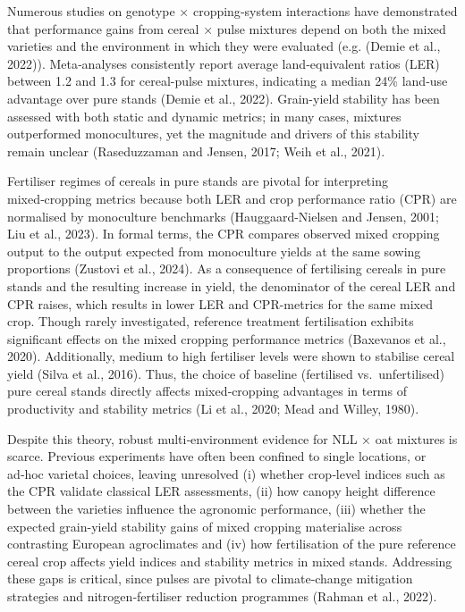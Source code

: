 \documentclass[
  british,
  a4paper,
  DIV=11,
  numbers=noendperiod]{scrreprt}
\begin{document}
Numerous studies on genotype × cropping‑system interactions have
demonstrated that performance gains from cereal × pulse mixtures depend
on both the mixed varieties and the environment in which they were
evaluated (e.g. (Demie et al., 2022)). Meta‑analyses consistently report
average land‑equivalent ratios (LER) between 1.2 and 1.3 for
cereal-pulse mixtures, indicating a median 24\% land‑use advantage over
pure stands (Demie et al., 2022). Grain-yield stability has been
assessed with both static and dynamic metrics; in many cases, mixtures
outperformed monocultures, yet the magnitude and drivers of this
stability remain unclear (Raseduzzaman and Jensen, 2017; Weih et al.,
2021).

Fertiliser regimes of cereals in pure stands are pivotal for
interpreting mixed‑cropping metrics because both LER and crop
performance ratio (CPR) are normalised by monoculture benchmarks
(Hauggaard-Nielsen and Jensen, 2001; Liu et al., 2023). In formal terms,
the CPR compares observed mixed cropping output to the output expected
from monoculture yields at the same sowing proportions (Zustovi et al.,
2024). As a consequence of fertilising cereals in pure stands and the
resulting increase in yield, the denominator of the cereal LER and CPR
raises, which results in lower LER and CPR-metrics for the same mixed
crop. Though rarely investigated, reference treatment fertilisation
exhibits significant effects on the mixed cropping performance metrics
(Baxevanos et al., 2020). Additionally, medium to high fertiliser levels
were shown to stabilise cereal yield (Silva et al., 2016). Thus, the
choice of baseline (fertilised vs.~unfertilised) pure cereal stands
directly affects mixed‑cropping advantages in terms of productivity and
stability metrics (Li et al., 2020; Mead and Willey, 1980).

Despite this theory, robust multi‑environment evidence for NLL × oat
mixtures is scarce. Previous experiments have often been confined to
single locations, or ad‑hoc varietal choices, leaving unresolved (i)
whether crop‑level indices such as the CPR validate classical LER
assessments, (ii) how canopy height difference between the varieties
influence the agronomic performance, (iii) whether the expected
grain-yield stability gains of mixed cropping materialise across
contrasting European agroclimates and (iv) how fertilisation of the pure
reference cereal crop affects yield indices and stability metrics in
mixed stands. Addressing these gaps is critical, since pulses are
pivotal to climate‑change mitigation strategies and nitrogen‑fertiliser
reduction programmes (Rahman et al., 2022).
\end{document}
